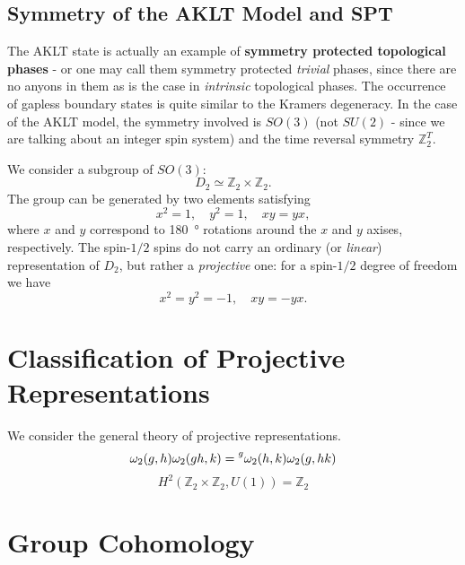 \documentclass[hyperref, a4paper]{article}
\newcommand*{\concept}[1]{{\textbf{#1}}}
\begin{document}
\subsection{Symmetry of the AKLT Model and SPT}

The AKLT state is actually an example of \concept{symmetry protected topological phases} - or one may call them symmetry protected \emph{trivial} phases, since there are no anyons in them as is the case in \emph{intrinsic} topological phases. 
The occurrence of gapless boundary states is quite similar to the Kramers degeneracy.
In the case of the AKLT model, the symmetry involved is $SO(3)$ (not $SU(2)$ - since we are talking about an integer spin system) and the time reversal symmetry $\mathbb{Z}_2^T$.

We consider a subgroup of $SO(3)$:
\begin{equation}
    D_2 \simeq \mathbb{Z}_2 \times \mathbb{Z}_2.
\end{equation}
The group can be generated by two elements satisfying
\begin{equation}
    x^2 = 1, \quad y^2 = 1, \quad xy = yx,
\end{equation}
where $x$ and $y$ correspond to \SI{180}{\degree} rotations around the $x$ and $y$ axises, respectively.
The spin-$1/2$ spins do not carry an ordinary (or \emph{linear}) representation of $D_2$, but rather a \emph{projective} one: for a spin-$1/2$ degree of freedom we have 
\begin{equation}
    x^2 = y^2 = -1, \quad xy = - yx.
\end{equation}

\section{Classification of Projective Representations}

We consider the general theory of projective representations.
\begin{equation}
    \omega_2(g, h) \omega_2(gh, k) = \prescript{g}{}{\omega_2(h, k)} \omega_2(g, hk)
\end{equation}
\begin{equation}
    H^2(\mathbb{Z}_2 \times \mathbb{Z}_2, U(1)) = \mathbb{Z}_2
\end{equation}

\section{Group Cohomology}


 
\end{document}
